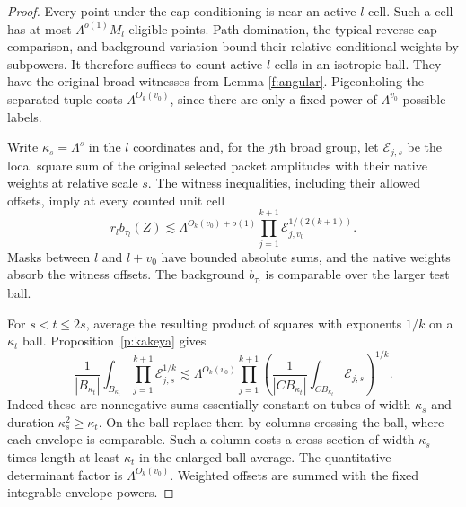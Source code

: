 \begin{proof}
Every point under the cap conditioning is near an active $l$ cell.
Such a cell has at most $\Lambda^{o(1)}M_l$ eligible points.
Path domination, the typical reverse cap comparison, and background
variation bound their relative conditional weights by subpowers.
It therefore suffices to count active $l$ cells in an isotropic
ball. They have the original broad witnesses from Lemma
\ref{f:angular}. Pigeonholing the separated tuple costs
$\Lambda^{O_k(v_0)}$, since there are only a fixed power of
$\Lambda^{v_0}$ possible labels.

Write $\kappa_s=\Lambda^s$ in the $l$ coordinates and, for the
$j$th broad group, let $\mathcal E_{j,s}$ be the local square sum of the original
selected packet amplitudes with their native weights at relative
scale $s$. The witness inequalities, including their allowed
offsets, imply at every counted unit cell
\[
 r_lb_{\tau_l}(Z)
 \lesssim\Lambda^{O_k(v_0)+o(1)}
             \prod_{j=1}^{k+1}\mathcal E_{j,v_0}^{1/(2(k+1))}.
\]
Masks between $l$ and $l+v_0$ have bounded absolute sums, and the
native weights absorb the witness offsets. The background
$b_{\tau_l}$ is comparable over the larger test ball.

For $s<t\le2s$, average the resulting product of squares with
exponents $1/k$ on a $\kappa_t$ ball. Proposition~\ref{p:kakeya}
gives
\begin{equation}\label{f:one-inflation}
 \frac1{|B_{\kappa_t}|}\int_{B_{\kappa_t}}
             \prod_{j=1}^{k+1}\mathcal E_{j,s}^{1/k}
 \lesssim\Lambda^{O_k(v_0)}
       \prod_{j=1}^{k+1}
          \left(\frac1{|CB_{\kappa_t}|}
                       \int_{CB_{\kappa_t}}\mathcal E_{j,s}\right)^{1/k}.
\end{equation}
Indeed these are nonnegative sums essentially constant on tubes of
width $\kappa_s$ and duration $\kappa_s^2\ge\kappa_t$. On the ball
replace them by columns crossing the ball, where each envelope is
comparable. Such a column costs a cross section of width
$\kappa_s$ times length at least $\kappa_t$ in the enlarged-ball
average. The quantitative determinant factor is
$\Lambda^{O_k(v_0)}$. Weighted offsets are summed with the fixed
integrable envelope powers.


\end{proof}
